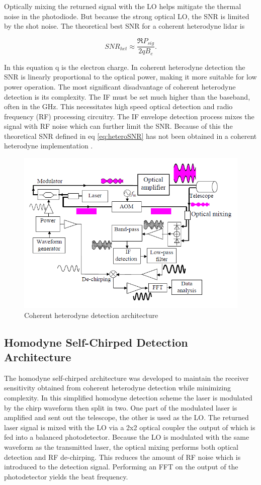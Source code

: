 Optically mixing the returned signal with the LO helps mitigate the thermal noise in the photodiode. But because
the strong optical LO, the SNR is limited by the shot noise. The theoretical best SNR for a coherent heterodyne 
lidar is

\begin{equation}
\label{eq:heteroSNR}
SNR_{het}\approx\frac{\Re P_{sig}}{2qB_e}. 
\end{equation}

In this equation q is the electron charge. In coherent heterodyne detection the SNR is linearly proportional to 
the optical power, making it more suitable for low power operation. The most significant disadvantage of coherent
heterodyne detection is its complexity. The IF must be set much higher than the baseband, often in the GHz. This 
necessitates high speed optical detection and radio frequency (RF) processing circuitry. The IF envelope detection
process mixes the signal with RF noise which can further limit the SNR. Because of this the theoretical SNR defined
in eq \ref{eq:heteroSNR} has not been obtained in a coherent heterodyne implementation \cite{1319mmPerf}.  

\begin{figure}[H]
	\centering
	\includegraphics[width=0.8\columnwidth]{figs/heterodyne}
	\vspace{1em}
	\caption{Coherent heterodyne detection architecture}
	\label{fig:heterodyneBlock}
\end{figure}


\subsection{Homodyne Self-Chirped Detection Architecture}
\label{sec:homodyneSelf}
The homodyne self-chirped architecture was developed to maintain the receiver sensitivity obtained from coherent
heterodyne detection while minimizing complexity. In this simplified homodyne detection scheme the laser is 
modulated by the chirp waveform then split in two. One part of the modulated laser is amplified and sent out the
telescope, the other is used as the LO. The returned laser signal is mixed with the LO via a 2x2 optical coupler
the output of which is fed into a balanced photodetector. Because the LO is modulated with the same waveform as 
the transmitted laser, the optical mixing performs both optical detection and RF de-chirping. This reduces the 
amount of RF noise which is introduced to the detection signal. Performing an FFT on the output of the photodetector
yields the beat frequency. 

